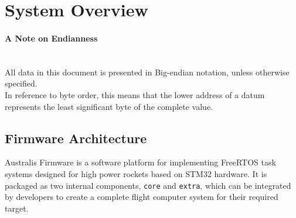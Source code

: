 \clearpage


\section{System Overview}

\begin{tcolorbox}[colback=red!5, breakable, enhanced]
\paragraph{\color{red}A Note on Endianness}\mbox{} \\[0.5em]
All data in this document is presented in Big-endian notation, unless otherwise specified.\\[0.5em]
In reference to byte order, this means that the lower address of a datum represents the least significant byte of the complete value.
\end{tcolorbox}

\subsection{Firmware Architecture}
Australis Firmware is a software platform for implementing FreeRTOS task systems designed for high power rockets based on STM32 hardware. It is packaged as two internal components, \verb|core| and \verb|extra|, which can be integrated by developers to create a complete flight computer system for their required target.

